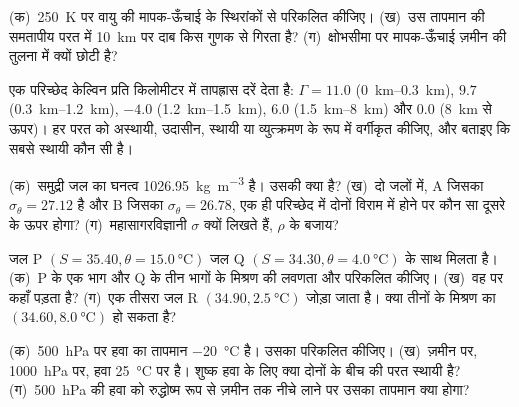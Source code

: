 \begin{exercise}[$\star$]\label{exo:b1:fluid-envelopes-structure:1}
(क)~\qty{250}{K} पर वायु की मापक-ऊँचाई  के स्थिरांकों से परिकलित कीजिए। (ख)~उस तापमान की समतापीय परत में \qty{10}{km} पर दाब किस गुणक से गिरता है? (ग)~क्षोभसीमा पर मापक-ऊँचाई ज़मीन की तुलना में क्यों छोटी है?
\end{exercise}

\begin{exercise}[$\star$]\label{exo:b1:fluid-envelopes-structure:2}
एक परिच्छेद केल्विन प्रति किलोमीटर में तापह्रास दरें देता है: $\Gamma = 11.0$ (\qtyrange{0}{0.3}{km}), $9.7$ (\qtyrange{0.3}{1.2}{km}), $-4.0$ (\qtyrange{1.2}{1.5}{km}), $6.0$ (\qtyrange{1.5}{8}{km}) और $0.0$ (\qty{8}{km} से ऊपर)। हर परत को अस्थायी, उदासीन, स्थायी या व्युत्क्रमण के रूप में वर्गीकृत कीजिए, और बताइए कि सबसे स्थायी कौन सी है।
\end{exercise}

\begin{exercise}[$\star$]\label{exo:b1:fluid-envelopes-structure:3}
(क)~समुद्री जल का घनत्व \qty{1026.95}{kg.m^{-3}} है। उसकी  क्या है? (ख)~दो जलों में, A जिसका $\sigma_\theta = 27.12$ है और B जिसका $\sigma_\theta = 26.78$, एक ही परिच्छेद में दोनों विराम में होने पर कौन सा दूसरे के ऊपर होगा? (ग)~महासागरविज्ञानी $\sigma$ क्यों लिखते हैं, $\rho$ के बजाय?
\end{exercise}

\begin{exercise}[$\star$]\label{exo:b1:fluid-envelopes-structure:4}
जल P $(S = 35.40, \theta = \qty{15.0}{\celsius})$ जल Q $(S =
34.30, \theta = \qty{4.0}{\celsius})$ के साथ मिलता है। (क)~P के एक भाग और Q के तीन भागों के मिश्रण की लवणता और  परिकलित कीजिए। (ख)~वह  पर कहाँ पड़ता है? (ग)~एक तीसरा जल R $(34.90,
\qty{2.5}{\celsius})$ जोड़ा जाता है। क्या तीनों के मिश्रण का $(34.60, \qty{8.0}{\celsius})$ हो सकता है?
\end{exercise}

\begin{exercise}[$\star\star$]\label{exo:b1:fluid-envelopes-structure:5}
(क)~\qty{500}{hPa} पर हवा का तापमान \qty{-20}{\celsius} है। उसका  परिकलित कीजिए। (ख)~ज़मीन पर, \qty{1000}{hPa} पर, हवा \qty{25}{\celsius} पर है। शुष्क हवा के लिए क्या दोनों के बीच की परत स्थायी है? (ग)~\qty{500}{hPa} की हवा को रुद्धोष्म रूप से ज़मीन तक नीचे लाने पर उसका तापमान क्या होगा?
\end{exercise}

